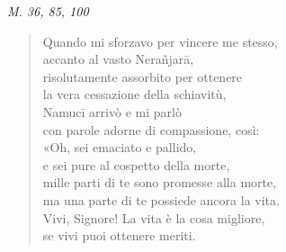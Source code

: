 \emph{M. 36, 85, 100}


\begin{quote}


Quando mi sforzavo per vincere me stesso, \\
accanto al vasto Nerañjarā, \\
risolutamente assorbito per ottenere \\
la vera cessazione della schiavitù, \\
Namucī arrivò e mi parlò \\
con parole adorne di compassione, così: \\
«Oh, sei emaciato e pallido, \\
e sei pure al cospetto della morte, \\
mille parti di te sono promesse alla morte, \\
ma una parte di te possiede ancora la vita. \\
Vivi, Signore! La vita è la cosa migliore, \\
se vivi puoi ottenere meriti.



\end{quote}
